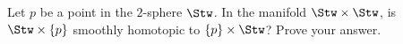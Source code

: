 Let $p$ be a point in the $2$-sphere $\Stw$. In the manifold
$\Stw\times \Stw$, is $\Stw \times \{p\}$ smoothly homotopic to
$\{p\}\times \Stw$? Prove your answer.
